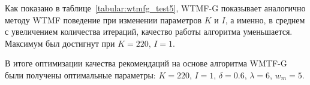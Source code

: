     Как показано в таблице~\ref{tabular:wtmfg_test5}, WTMF-G показывает аналогично методу WTMF поведение при изменении параметров $K$ и $I$, а именно, в среднем с увеличением количества итераций, качество работы алгоритма уменьшается.
    Максимум был достигнут при $K=220$, $I=1$.

    В итоге оптимизации качества рекомендаций на основе алгоритма WMTF-G были получены оптимальные параметры:
    $K=220$, $I=1$, $\delta=0.6$, $\lambda=6$, $w_m=5$.
